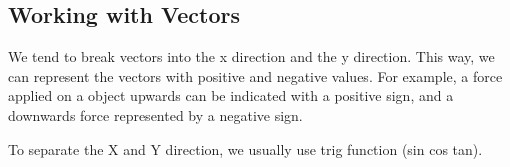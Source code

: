\documentclass[../notes.tex]{subfiles}
\begin{document}
\subsection{Working with Vectors}
We tend to break vectors into the x direction and the y direction.
This way, we can represent the vectors with positive and negative values.
For example, a force applied on a object upwards can be indicated with a positive sign, and a downwards force represented by a negative sign.

To separate the X and Y direction, we usually use trig function (sin cos tan).
\end{document}
